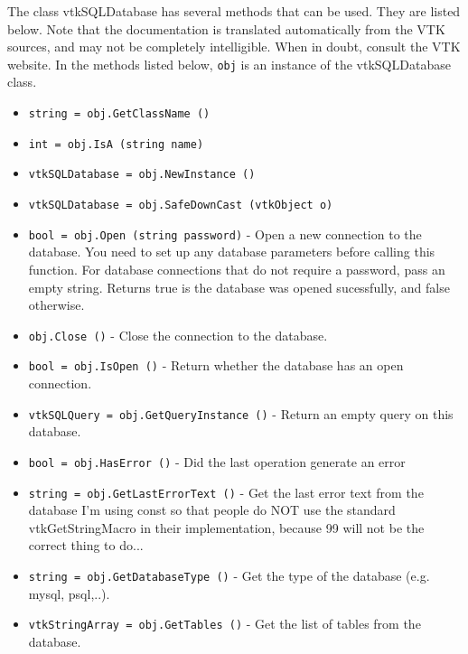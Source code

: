 The class vtkSQLDatabase has several methods that can be used.
  They are listed below.
Note that the documentation is translated automatically from the VTK sources,
and may not be completely intelligible.  When in doubt, consult the VTK website.
In the methods listed below, \verb|obj| is an instance of the vtkSQLDatabase class.
\begin{itemize}
\item  \verb|string = obj.GetClassName ()|

\item  \verb|int = obj.IsA (string name)|

\item  \verb|vtkSQLDatabase = obj.NewInstance ()|

\item  \verb|vtkSQLDatabase = obj.SafeDownCast (vtkObject o)|

\item  \verb|bool = obj.Open (string password)| -  Open a new connection to the database.
 You need to set up any database parameters before calling this function.
 For database connections that do not require a password, pass an empty string.
 Returns true is the database was opened sucessfully, and false otherwise.

\item  \verb|obj.Close ()| -  Close the connection to the database.

\item  \verb|bool = obj.IsOpen ()| -  Return whether the database has an open connection.

\item  \verb|vtkSQLQuery = obj.GetQueryInstance ()| -  Return an empty query on this database.

\item  \verb|bool = obj.HasError ()| -  Did the last operation generate an error

\item  \verb|string = obj.GetLastErrorText ()| -  Get the last error text from the database
 I'm using const so that people do NOT
 use the standard vtkGetStringMacro in their
 implementation, because 99%
 will not be the correct thing to do...

\item  \verb|string = obj.GetDatabaseType ()| -  Get the type of the database (e.g. mysql, psql,..).

\item  \verb|vtkStringArray = obj.GetTables ()| -  Get the list of tables from the database.


\end{itemize}
